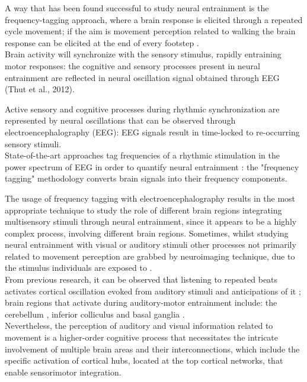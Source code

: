 A way that has been found successful to study neural entrainment is the frequency-tagging approach, where a brain response is elicited through a repeated cycle movement; if the aim is movement perception related to walking the brain response can be elicited at the end of every footstep \parencite{Cracco_2022}. \\
Brain activity will synchronize with the sensory stimulus, rapidly entraining motor responses: the cognitive and sensory processes present in neural entrainment are reflected in neural oscillation signal obtained through EEG (Thut et al., 2012).

Active sensory and cognitive processes during rhythmic synchronization are represented by neural oscillations that can be observed through electroencephalography (EEG): EEG signals result in time-locked to re-occurring sensory stimuli. \\
State-of-the-art approaches tag frequencies of a rhythmic stimulation in the power spectrum of EEG in order to quantify neural entrainment \parencite{Nozaradan_2011}: the "frequency tagging" methodology converts brain signals into their frequency components. 

The usage of frequency tagging with electroencephalography results in the most appropriate technique to study the role of different brain regions integrating multisensory stimuli through neural entrainment, since it appears to be a highly complex process, involving different brain regions. Sometimes, whilst studying neural entrainment with visual or auditory stimuli other processes not primarily related to movement perception are grabbed by neuroimaging technique, due to the stimulus individuals are exposed to \parencite{Oomen_2022}. \\
From previous research, it can be observed that listening to repeated beats activates cortical oscillation evoked from auditory stimuli and anticipations of it \parencite{Snyder_2005}; brain regions that activate during auditory-motor entrainment include: the cerebellum \parencite{Grahn_2011}, inferior colliculus \parencite{Tierney_2013} and basal ganglia \parencite{Thaut_2009}. \\
Nevertheless, the perception of auditory and visual information related to movement is a higher-order cognitive process that necessitates the intricate involvement of multiple brain areas and their interconnections, which include the specific activation of cortical hubs, located at the top cortical networks, that enable sensorimotor integration.

